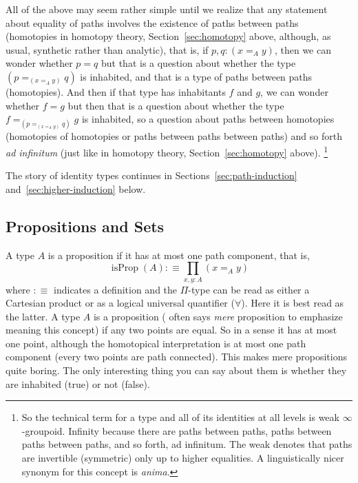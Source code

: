 \documentclass[11pt]{article}
\DeclareMathOperator{\isProp}{isProp}
\begin{document}
All of the above may seem rather simple until we realize that any
statement about equality of paths involves the existence of paths between
paths (homotopies in homotopy theory, Section~\ref{sec:homotopy} above,
although, as usual, synthetic rather than analytic), that is, if
$p, q : (x =_A y)$, then we can wonder whether $p = q$ but that is
a question about whether the type $(p =_{(x =_A y)} q)$ is inhabited,
and that is a type of paths between paths (homotopies).
And then if that type has inhabitants $f$ and $g$, we can wonder whether
$f = g$ but then that is a question about whether the type
$f =_{\left(p =_{(x =_A y)} q\right)} g$ is inhabited, so a question about paths
between homotopies (homotopies of homotopies
or paths between paths between paths) and so forth \emph{ad infinitum}
(just like in homotopy theory, Section~\ref{sec:homotopy} above).
\footnote{So the technical term for a type and all of its identities at
all levels is weak $\infty$-groupoid.
Infinity because there are paths between paths, paths between paths between
paths, and so forth, ad infinitum.  The weak denotes that paths are invertible
(symmetric) only up to higher equalities.  A linguistically nicer synonym
for this concept is \emph{anima}.\label{foot:infinity-groupoid}}

The story of identity types continues in Sections~\ref{sec:path-induction}
and~\ref{sec:higher-induction} below.

\subsection{Propositions and Sets}

A type $A$ is a proposition  if it
has at most one path component, that is,
\begin{equation} \label{eq:proposition}
   \isProp(A) :\equiv \prod_{x, y : A} (x =_A y)
\end{equation}
where $:\equiv$ indicates a definition and the $\Pi$-type can be read
as either a Cartesian product or as a logical universal quantifier ($\forall$).
Here it is best read as the latter.  A type $A$ is a proposition
( often says \emph{mere} proposition
to emphasize meaning this concept) if any two points are equal.
So in a sense it has at most one point, although the homotopical interpretation
is at most one path component (every two points are path connected).
This makes mere propositions quite boring.
The only interesting thing you can say
about them is whether they are inhabited (true) or not (false).
\end{document}
